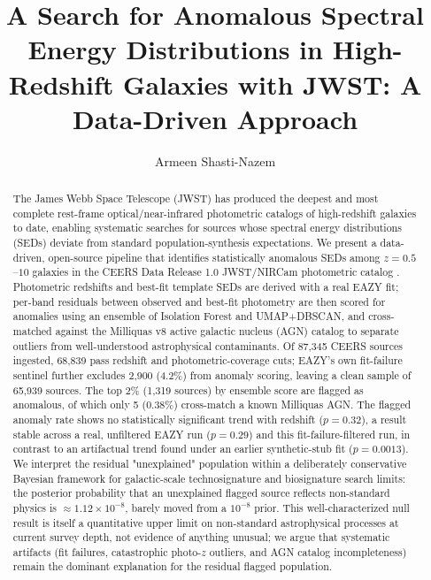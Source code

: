 \documentclass[twocolumn]{aastex631}
\begin{document}
\title{A Search for Anomalous Spectral Energy Distributions in High-Redshift
Galaxies with JWST: A Data-Driven Approach}

\author[0009-0006-7506-5070]{Armeen Shasti-Nazem}


\begin{abstract}

The James Webb Space Telescope (JWST) has produced the deepest and most
complete rest-frame optical/near-infrared photometric catalogs of
high-redshift galaxies to date, enabling systematic searches for sources
whose spectral energy distributions (SEDs) deviate from standard
population-synthesis expectations. We present a data-driven, open-source
pipeline that identifies statistically anomalous SEDs among $z=0.5$--$10$
galaxies in the CEERS Data Release 1.0 JWST/NIRCam photometric catalog
\citep{Cox2025}. Photometric redshifts and best-fit template SEDs are
derived with a real EAZY fit; per-band residuals between observed and
best-fit photometry are then scored for anomalies using an ensemble of
Isolation Forest and UMAP+DBSCAN, and cross-matched against the Milliquas
v8 active galactic nucleus (AGN) catalog to separate outliers from
well-understood astrophysical contaminants. Of 87,345 CEERS sources
ingested, 68,839 pass redshift and photometric-coverage cuts; EAZY's own
fit-failure sentinel further excludes 2,900 (4.2\%) from anomaly scoring,
leaving a clean sample of 65,939 sources. The top 2\% (1,319 sources) by
ensemble score are flagged as anomalous, of which only 5 (0.38\%)
cross-match a known Milliquas AGN. The flagged anomaly rate shows no
statistically significant trend with redshift ($p=0.32$), a result stable
across a real, unfiltered EAZY run ($p=0.29$) and this fit-failure-filtered
run, in contrast to an artifactual trend found under an earlier
synthetic-stub fit ($p=0.0013$). We interpret the residual "unexplained"
population within a deliberately conservative Bayesian framework for
galactic-scale technosignature and biosignature search limits: the
posterior probability that an unexplained flagged source reflects
non-standard physics is $\approx 1.12\times10^{-8}$, barely moved from a
$10^{-8}$ prior. This well-characterized null result is itself a
quantitative upper limit on non-standard astrophysical processes at current
survey depth, not evidence of anything unusual; we argue that systematic
artifacts (fit failures, catastrophic photo-$z$ outliers, and AGN
catalog incompleteness) remain the dominant explanation for the residual
flagged population.

\end{abstract}
\end{document}
